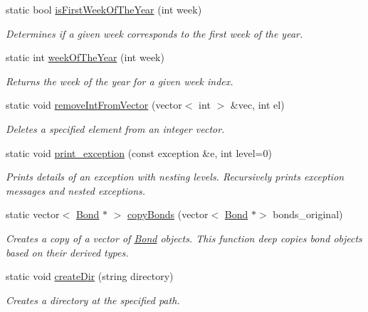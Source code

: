 \begin{DoxyCompactItemize}
static bool \mbox{\hyperlink{classUtils_a3e4c6e935243165c89f059c5fedf2945}{is\+First\+Week\+Of\+The\+Year}} (int week)
\begin{DoxyCompactList}\small\item\em Determines if a given week corresponds to the first week of the year. \end{DoxyCompactList}\item 
static int \mbox{\hyperlink{classUtils_a510a7b15687fc6bd6b1c1742d7d7e9fd}{week\+Of\+The\+Year}} (int week)
\begin{DoxyCompactList}\small\item\em Returns the week of the year for a given week index. \end{DoxyCompactList}\item 
static void \mbox{\hyperlink{classUtils_a6022da71d614027a1da3a996531df85e}{remove\+Int\+From\+Vector}} (vector$<$ int $>$ \&vec, int el)
\begin{DoxyCompactList}\small\item\em Deletes a specified element from an integer vector. \end{DoxyCompactList}\item 
static void \mbox{\hyperlink{classUtils_a25184c319ab70a93b056d516e0aafd8e}{print\+\_\+exception}} (const exception \&e, int level=0)
\begin{DoxyCompactList}\small\item\em Prints details of an exception with nesting levels. Recursively prints exception messages and nested exceptions. \end{DoxyCompactList}\item 
static vector$<$ \mbox{\hyperlink{classBond}{Bond}} $\ast$ $>$ \mbox{\hyperlink{classUtils_af59616433568dbc50e28290524f40faa}{copy\+Bonds}} (vector$<$ \mbox{\hyperlink{classBond}{Bond}} $\ast$$>$ bonds\+\_\+original)
\begin{DoxyCompactList}\small\item\em Creates a copy of a vector of {\ttfamily \mbox{\hyperlink{classBond}{Bond}}} objects. This function deep copies bond objects based on their derived types. \end{DoxyCompactList}\item 
static void \mbox{\hyperlink{classUtils_a383900ac38ca9c17e58d8ff2156ac100}{create\+Dir}} (string directory)
\begin{DoxyCompactList}\small\item\em Creates a directory at the specified path. \end{DoxyCompactList}\end{DoxyCompactItemize}


